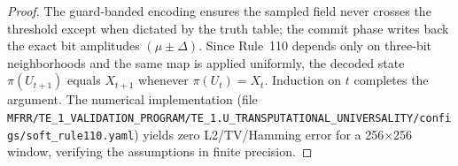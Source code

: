 \begin{proof}
The guard-banded encoding ensures the sampled field never crosses the threshold except when dictated by the truth table; the commit phase writes back the exact bit amplitudes $(\mu\pm\Delta)$. Since Rule~110 depends only on three-bit neighborhoods and the same map is applied uniformly, the decoded state $\pi(U_{t+1})$ equals $X_{t+1}$ whenever $\pi(U_t)=X_t$. Induction on $t$ completes the argument. The numerical implementation (file 
\texttt{MFRR/TE\_1\_VALIDATION\_PROGRAM/TE\_1.U\_TRANSPUTATIONAL\_UNIVERSALITY/configs/soft\_rule110.yaml}) yields zero L2/TV/Hamming error for a 256×256 window, verifying the assumptions in finite precision.
\end{proof}
